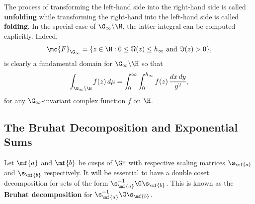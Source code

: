 \documentclass[12pt]{article}
\begin{document}
      The process of transforming the left-hand side into the right-hand side is called \textbf{unfolding} while transforming the right-hand into the left-hand side is called \textbf{folding}. In the special case of \(\G_{\infty}\backslash\H\), the latter integral can be computed explicitly. Indeed,
      \[
        \mc{F}_{\G_{\infty}} = \{z \in \H:0 \le \Re(z) \le h_{\infty} \text{ and } \Im(z) > 0\},
      \]
      is clearly a fundamental domain for \(\G_{\infty}\backslash\H\) so that
      \[
        \int_{\G_{\infty}\backslash\H}f(z)\,d\mu = \int_{0}^{\infty}\int_{0}^{h_{\infty}}f(z)\,\frac{dx\,dy}{y^{2}},
      \]
      for any \(\G_{\infty}\)-invariant complex function \(f\) on \(\H\).
    \subsection{The Bruhat Decomposition and Exponential Sums}
      Let \(\mf{a}\) and \(\mf{b}\) be cusps of \(\GH\) with respective scaling matrices \(\s_{\mf{a}}\) and \(\s_{\mf{b}}\) respectively. It will be essential to have a double coset decomposition for sets of the form \(\s_{\mf{a}}^{-1}\G\s_{\mf{b}}\). This is known as the \textbf{Bruhat decomposition} for \(\s_{\mf{a}}^{-1}\G\s_{\mf{b}}\).
\end{document}
